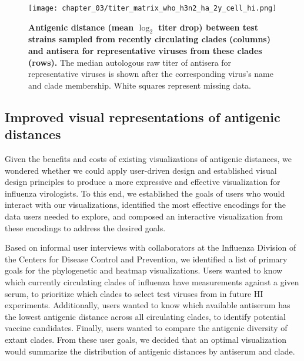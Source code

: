 \begin{figure}
  \centering
  \texttt{[image: chapter\_03/titer\_matrix\_who\_h3n2\_ha\_2y\_cell\_hi.png]}
  \caption[{Antigenic distance (mean $\log_{2}$ titer drop) between test strains sampled from recently circulating clades (columns) and antisera for representative viruses from these clades (rows).}]{\label{fig:titer-matrix} {\bf Antigenic distance (mean $\log_{2}$ titer drop) between test strains sampled from recently circulating clades (columns) and antisera for representative viruses from these clades (rows).}
    The median autologous raw titer of antisera for representative viruses is shown after the corresponding virus's name and clade membership.
    White squares represent missing data.}
\end{figure}

\subsection{Improved visual representations of antigenic distances}

Given the benefits and costs of existing visualizations of antigenic distances, we wondered whether we could apply user-driven design and established visual design principles to produce a more expressive and effective visualization for influenza virologists.
To this end, we established the goals of users who would interact with our visualizations, identified the most effective encodings for the data users needed to explore, and composed an interactive visualization from these encodings to address the desired goals.

Based on informal user interviews with collaborators at the Influenza Division of the Centers for Disease Control and Prevention, we identified a list of primary goals for the phylogenetic and heatmap visualizations.
Users wanted to know which currently circulating clades of influenza have measurements against a given serum, to prioritize which clades to select test viruses from in future HI experiments.
Additionally, users wanted to know which available antiserum has the lowest antigenic distance across all circulating clades, to identify potential vaccine candidates.
Finally, users wanted to compare the antigenic diversity of extant clades.
From these user goals, we decided that an optimal visualization would summarize the distribution of antigenic distances by antiserum and clade.

